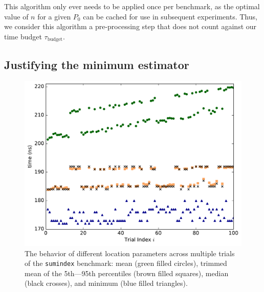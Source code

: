 \documentclass[conference]{IEEEtran}
\begin{document}
This algorithm only ever needs to be applied once per benchmark, as the optimal value of $n$
for a given $P_0$ can be cached for use in subsequent experiments. Thus, we consider this
algorithm a pre-processing step that does not count against our time budget
$\tau_{\textrm{budget}}$.

\label{sec:minimum}
\subsection{Justifying the minimum estimator}

\begin{figure}
\centering
\includegraphics[width=\columnwidth]{figures/fig3/location_estimators_sumindex}
\caption{The behavior of different location parameters across multiple trials of
the \lstinline|sumindex| benchmark: mean (green filled circles), trimmed mean of
the 5th---95th percentiles (brown filled squares), median (black crosses), and
minimum (blue filled triangles).}
\label{fig:locationmeasures}
\end{figure}

\end{document}

